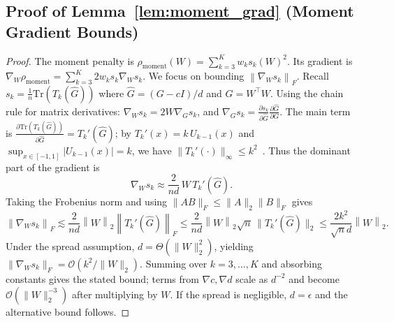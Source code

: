 \documentclass{opt2025}
\newcommand{\Tr}{\mathrm{Tr}}
\newcommand{\norm}[1]{\left\lVert #1 \right\rVert}
\newcommand{\Ghat}{\widehat{G}}
\begin{document}
\subsection{Proof of Lemma~\ref{lem:moment_grad} (Moment Gradient Bounds)}
\begin{proof}
The moment penalty is $\rho_{\text{moment}}(W) = \sum_{k=3}^{K} w_k s_k(W)^2$. Its gradient is $\nabla_W \rho_{\text{moment}} = \sum_{k=3}^{K} 2w_k s_k \nabla_W s_k$. We focus on bounding $\norm{\nabla_W s_k}_F$. Recall $s_k = \frac{1}{n}\Tr(T_k(\Ghat))$ where $\Ghat=(G-cI)/d$ and $G=W^\top W$.
Using the chain rule for matrix derivatives: $\nabla_W s_k = 2W \nabla_G s_k$, and $\nabla_G s_k = \frac{\partial s_k}{\partial \Ghat} \frac{\partial \Ghat}{\partial G}$.
The main term is $\frac{\partial \Tr(T_k(\Ghat))}{\partial \Ghat} = T_k'(\Ghat)$; by $T_k'(x)=k\,U_{k-1}(x)$ and $\sup_{x\in[-1,1]}|U_{k-1}(x)|=k$, we have $\|T_k'(\cdot)\|_\infty\le k^2$~\citep[Thm.~1.2]{Rivlin1990}.
Thus the dominant part of the gradient is
\[
\nabla_W s_k \approx \frac{2}{nd}\,W\, T_k'(\Ghat).
\]
Taking the Frobenius norm and using $\|AB\|_F \le \|A\|_2\|B\|_F$ gives
\[
\norm{\nabla_W s_k}_F \lesssim \frac{2}{nd} \norm{W}_2 \norm{T_k'(\Ghat)}_F
\le \frac{2}{nd} \norm{W}_2 \sqrt{n}\,\|T_k'(\Ghat)\|_2
\le \frac{2 k^2}{\sqrt{n} d} \norm{W}_2.
\]
Under the spread assumption, $d = \Theta(\|W\|_2^2)$, yielding $\|\nabla_W s_k\|_F=\mathcal{O}(k^2/\|W\|_2)$. Summing over $k=3,\dots,K$ and absorbing constants gives the stated bound; terms from $\nabla c,\nabla d$ scale as $d^{-2}$ and become $\mathcal{O}(\|W\|_2^{-3})$ after multiplying by $W$. If the spread is negligible, $d=\epsilon$ and the alternative bound follows.
\end{proof}
\end{document}
